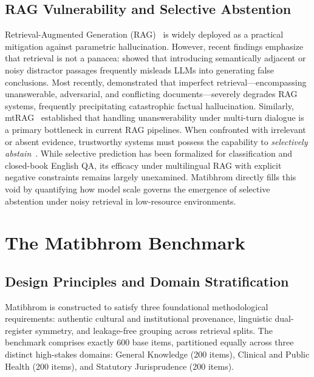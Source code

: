 \documentclass[11pt,a4paper,twocolumn]{article}
\begin{document}
\subsection{RAG Vulnerability and Selective Abstention}
Retrieval-Augmented Generation (RAG)~\citep{lewis2020rag} is widely deployed as a practical mitigation against parametric hallucination. However, recent findings emphasize that retrieval is not a panacea: \citet{cuconasu2024power} showed that introducing semantically adjacent or noisy distractor passages frequently misleads LLMs into generating false conclusions. Most recently, \citet{park2024robust} demonstrated that imperfect retrieval---encompassing unanswerable, adversarial, and conflicting documents---severely degrades RAG systems, frequently precipitating catastrophic factual hallucination. Similarly, mtRAG~\citep{katsis2025mtrag} established that handling unanswerability under multi-turn dialogue is a primary bottleneck in current RAG pipelines. When confronted with irrelevant or absent evidence, trustworthy systems must possess the capability to \emph{selectively abstain}~\citep{kadavath2022language,cole2023selectively,yin2023large}. While selective prediction has been formalized for classification and closed-book English QA, its efficacy under multilingual RAG with explicit negative constraints remains largely unexamined. Matibhrom directly fills this void by quantifying how model scale governs the emergence of selective abstention under noisy retrieval in low-resource environments.

\section{The Matibhrom Benchmark}
\label{sec:benchmark}

\subsection{Design Principles and Domain Stratification}
Matibhrom is constructed to satisfy three foundational methodological requirements: authentic cultural and institutional provenance, linguistic dual-register symmetry, and leakage-free grouping across retrieval splits. The benchmark comprises exactly 600 base items, partitioned equally across three distinct high-stakes domains: General Knowledge (200 items), Clinical and Public Health (200 items), and Statutory Jurisprudence (200 items). 
\end{document}
